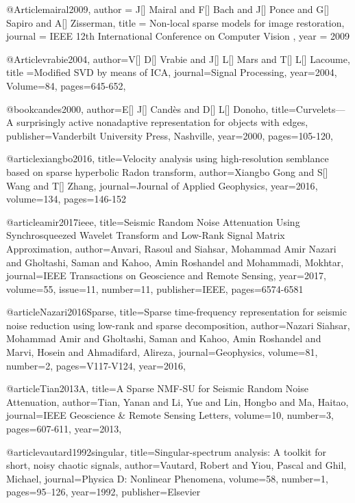@Article{mairal2009,
  author = 	 {J[] Mairal and F[] Bach and J[] Ponce and G[] Sapiro and A[] Zisserman},
  title = 	 {Non-local sparse models for image restoration},
  journal = 	 {IEEE 12th International Conference on Computer Vision  },
  year = 	 2009}


@Article{vrabie2004,
  author={V[] D[] Vrabie and J[] L[] Mars and T[] L[] Lacoume},
  title ={Modified SVD by means of ICA},
  journal={Signal Processing},
  year=2004,
  Volume=84,
  pages={645-652},
}

@book{candes2000,
  author={E[] J[] Cand\`{e}s and D[] L[] Donoho},
  title={Curvelets—A surprisingly active nonadaptive representation for objects with edges},
  publisher={Vanderbilt University Press, Nashville},
  year=2000,
    pages={105-120},
}



@article{xiangbo2016,
  title={Velocity analysis using high-resolution semblance based on sparse hyperbolic Radon transform},
  author={Xiangbo Gong and S[] Wang and T[] Zhang},
  journal={Journal of Applied Geophysics},
  year={2016},
  volume=134,
  pages={146-152}
}



@article{amir2017ieee,
  title={Seismic Random Noise Attenuation Using Synchrosqueezed Wavelet Transform and Low-Rank Signal Matrix Approximation},
  author={Anvari, Rasoul and Siahsar, Mohammad Amir Nazari and Gholtashi, Saman and Kahoo, Amin Roshandel and Mohammadi, Mokhtar},
  journal={IEEE Transactions on Geoscience and Remote Sensing},
  year={2017},
  volume=55,
  issue=11,
  number=11,
  publisher={IEEE},
  pages={6574-6581}
}

@article{Nazari2016Sparse,
  title={Sparse time-frequency representation for seismic noise reduction using low-rank and sparse decomposition},
  author={Nazari Siahsar, Mohammad Amir and Gholtashi, Saman and Kahoo, Amin Roshandel and Marvi, Hosein and Ahmadifard, Alireza},
  journal={Geophysics},
  volume={81},
  number={2},
  pages={V117-V124},
  year={2016},
}

@article{Tian2013A,
  title={A Sparse NMF-SU for Seismic Random Noise Attenuation},
  author={Tian, Yanan and Li, Yue and Lin, Hongbo and Ma, Haitao},
  journal={IEEE Geoscience \& Remote Sensing Letters},
  volume={10},
  number={3},
  pages={607-611},
  year={2013},
}


@article{vautard1992singular,
  title={Singular-spectrum analysis: A toolkit for short, noisy chaotic signals},
  author={Vautard, Robert and Yiou, Pascal and Ghil, Michael},
  journal={Physica D: Nonlinear Phenomena},
  volume={58},
  number={1},
  pages={95--126},
  year={1992},
  publisher={Elsevier}
}


